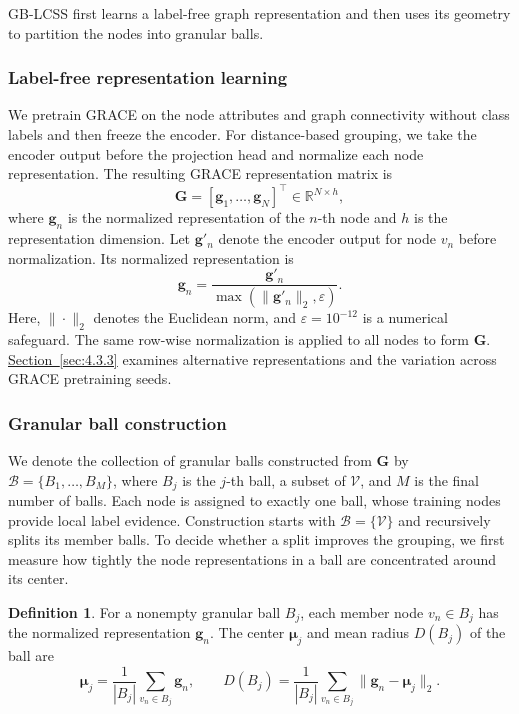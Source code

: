 \documentclass[10pt,letterpaper,nopreprintline]{elsarticle}
\theoremstyle{definition}
\newtheorem{definition}{Definition}
\theoremstyle{plain}
\begin{document}
GB-LCSS first learns a label-free graph representation and then uses its geometry to partition the nodes into granular balls.

\subsubsection{Label-free representation learning}\label{sec:3.2.1}

We pretrain GRACE \cite{ref12} on the node attributes and graph connectivity without class labels and then freeze the encoder. For distance-based grouping, we take the encoder output before the projection head and normalize each node representation. The resulting GRACE representation matrix is
\begin{equation}\label{eq:2}
\mathbf G=[\mathbf g_1,\ldots,\mathbf g_N]^\top\in\mathbb R^{N\times h},
\end{equation}
where \(\mathbf g_n\) is the normalized representation of the \(n\)-th node and \(h\) is the representation dimension. Let \(\mathbf g'_n\) denote the encoder output for node \(v_n\) before normalization. Its normalized representation is
\begin{equation}\label{eq:3}
\mathbf g_n=\frac{\mathbf g'_n}{\max(\|\mathbf g'_n\|_2,\varepsilon)}.
\end{equation}
Here, \(\|\cdot\|_2\) denotes the Euclidean norm, and \(\varepsilon=10^{-12}\) is a numerical safeguard. The same row-wise normalization is applied to all nodes to form \(\mathbf G\). \hyperref[sec:4.3.3]{Section~\ref*{sec:4.3.3}} examines alternative representations and the variation across GRACE pretraining seeds.

\subsubsection{Granular ball construction}\label{sec:3.2.2}

We denote the collection of granular balls constructed from \(\mathbf G\) by \(\mathcal B=\{B_1,\ldots,B_M\}\), where \(B_j\) is the \(j\)-th ball, a subset of \(\mathcal V\), and \(M\) is the final number of balls. Each node is assigned to exactly one ball, whose training nodes provide local label evidence. Construction starts with \(\mathcal B=\{\mathcal V\}\) and recursively splits its member balls. To decide whether a split improves the grouping, we first measure how tightly the node representations in a ball are concentrated around its center.

\Needspace{64pt}
\begin{definition}
For a nonempty granular ball \(B_j\), each member node \(v_n\in B_j\) has the normalized representation \(\mathbf g_n\). The center \(\boldsymbol\mu_j\) and mean radius \(D(B_j)\) of the ball are
\begin{equation}\label{eq:4}
\boldsymbol\mu_j=\frac{1}{|B_j|}\sum_{v_n\in B_j}\mathbf g_n,
\qquad D(B_j)=\frac{1}{|B_j|}\sum_{v_n\in B_j}\|\mathbf g_n-\boldsymbol\mu_j\|_2.
\end{equation}
\end{definition}
\end{document}
